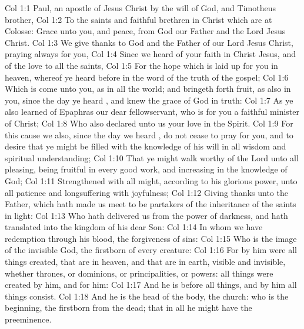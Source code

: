 \vs Col 1:1 Paul, an apostle of Jesus Christ by the will of God, and Timotheus  brother,
\vs Col 1:2 To the saints and faithful brethren in Christ which are at Colosse: Grace  unto you, and peace, from God our Father and the Lord Jesus Christ.
\vs Col 1:3 We give thanks to God and the Father of our Lord Jesus Christ, praying always for you,
\vs Col 1:4 Since we heard of your faith in Christ Jesus, and of the love  to all the saints,
\vs Col 1:5 For the hope which is laid up for you in heaven, whereof ye heard before in the word of the truth of the gospel;
\vs Col 1:6 Which is come unto you, as  in all the world; and bringeth forth fruit, as  also in you, since the day ye heard , and knew the grace of God in truth:
\vs Col 1:7 As ye also learned of Epaphras our dear fellowservant, who is for you a faithful minister of Christ;
\vs Col 1:8 Who also declared unto us your love in the Spirit.
\vs Col 1:9 For this cause we also, since the day we heard , do not cease to pray for you, and to desire that ye might be filled with the knowledge of his will in all wisdom and spiritual understanding;
\vs Col 1:10 That ye might walk worthy of the Lord unto all pleasing, being fruitful in every good work, and increasing in the knowledge of God;
\vs Col 1:11 Strengthened with all might, according to his glorious power, unto all patience and longsuffering with joyfulness;
\vs Col 1:12 Giving thanks unto the Father, which hath made us meet to be partakers of the inheritance of the saints in light:
\vs Col 1:13 Who hath delivered us from the power of darkness, and hath translated  into the kingdom of his dear Son:
\vs Col 1:14 In whom we have redemption through his blood,  the forgiveness of sins:
\vs Col 1:15 Who is the image of the invisible God, the firstborn of every creature:
\vs Col 1:16 For by him were all things created, that are in heaven, and that are in earth, visible and invisible, whether  thrones, or dominions, or principalities, or powers: all things were created by him, and for him:
\vs Col 1:17 And he is before all things, and by him all things consist.
\vs Col 1:18 And he is the head of the body, the church: who is the beginning, the firstborn from the dead; that in all  he might have the preeminence.
